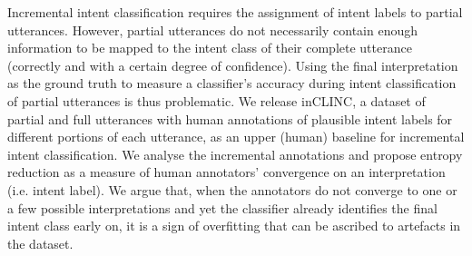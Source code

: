 Incremental intent classification requires the assignment of intent labels to partial utterances. However, partial utterances do not necessarily contain enough information to be mapped to the intent class of their complete utterance (correctly and with a certain degree of confidence). Using the final interpretation as the ground truth to measure a classifier's accuracy during intent classification of partial utterances is thus problematic. We release inCLINC, a dataset of partial and full utterances with human annotations of plausible intent labels for different portions of each utterance, as an upper (human) baseline for incremental intent classification. We analyse the incremental annotations and propose entropy reduction as a measure of human annotators' convergence on an interpretation (i.e. intent label). We argue that, when the annotators do not converge to one or a few possible interpretations and yet the classifier already identifies the final intent class early on, it is a sign of overfitting that can be ascribed to artefacts in the dataset.
